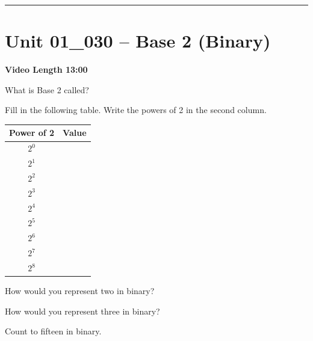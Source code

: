 \documentclass[letterpaper,12pt]{exam}
\newcommand{\unit}{Unit 01}
\begin{document}
\begin{questions}
\rule{0.5\textwidth}{.4pt} %

\section*{\unit\_030 -- Base 2 (Binary) }
\par{\selectfont\textbf{Video Length 13:00}}
\begin{samepage}
    \question What is Base 2 called?
    \vspace{5mm}
\end{samepage}


Fill in the following table.  Write the powers of 2 in the second column.

\begin{Large}
\begin{tabular}{| c | c |}

 \hline
    Power of 2& Value \\
    \hline
 $2^0 $ &  \\
 \hline 
$2^1 $ &  \\
 \hline 
$2^2 $ &  \\
 \hline 
$2^3 $ &  \\
 \hline 
$2^4 $ &  \\
 \hline 
$2^5 $ &  \\
 \hline 
$2^6 $ &  \\
 \hline 
$2^7 $ &  \\
 \hline 
$2^8 $ &  \\
 \hline 

\end{tabular}
\end{Large}
\begin{samepage}
    \question How would you represent two in binary?
    \vspace{5mm}
\end{samepage}
\newpage
 
\begin{samepage}
    \question How would you represent three in binary?
    \vspace{5mm}
\end{samepage}

\begin{samepage}
    \question Count to fifteen in binary.
    \par
\begin{huge}
\begin{tabular}{| c | c |}


\end{tabular}
\end{huge}
\end{samepage}
\end{questions}
\end{document}
